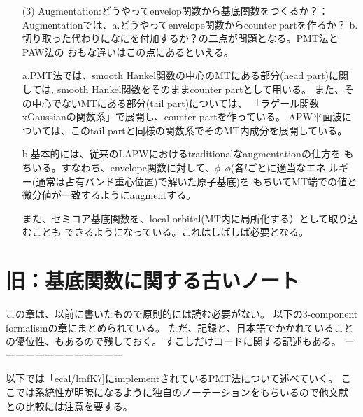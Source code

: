 \documentclass[a4paper,10pt,aip,onecolumn,amsmath,amssymb,floatfix,rmp]{revtex4-1}
\def\phidot{\dot{\phi}}
\begin{document}
\begin{itemize}
\item[(3)]
Augmentation:どうやってenvelop関数から基底関数をつくるか？：\\
Augmentationでは、a.どうやってenvelope関数からcounter partを作るか？
b.切り取った代わりになにを付加するか？の二点が問題となる。PMT法とPAW法の
おもな違いはこの点にあるといえる。

a.PMT法では、smooth Hankel関数の中心のMTにある部分(head part)に関しては,
smooth Hankel関数をそのままcounter partとして用いる。
また、その中心でないMTにある部分(tail part)については、
「ラゲール関数xGaussianの関数系」で展開し、counter partを作っている。
APW平面波については、このtail partと同様の関数系でそのMT内成分を展開している。

b.基本的には、従来のLAPWにおけるtraditionalなaugmentationの仕方を
もちいる。すなわち、envelope関数に対して、$\phi,\phidot$(各$l$ごとに適当なエネ
ルギー(通常は占有バンド重心位置)で解いた原子基底)を
もちいてMT端での値と微分値が一致するようにaugmentする。


また、セミコア基底関数を、local orbital(MT内に局所化する）として取り込むことも
できるようになっている。これはしばしば必要となる。

\end{itemize}


\section{旧：基底関数に関する古いノート} %
\label{sec:oldbasis}
この章は、以前に書いたもので原則的には読む必要がない。
以下の3-component formalismの章にまとめられている。
ただ、記録と、日本語でかかれていることの優位性、もあるので残しておく。
すこしだけコードに関する記述もある。
ーーーーーーーーーーーーー

以下では「ecal/lmfK7]にimplementされているPMT法について述べていく。
ここでは系統性が明瞭になるように独自のノーテーションをもちいるので他文献
との比較には注意を要する。

\end{document}
